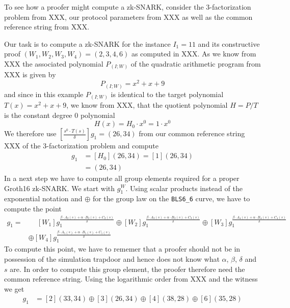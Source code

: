 \begin{example} To see how a proofer might compute 
a zk-SNARK, consider the $3$-factorization problem from XXX, our protocol parameters from XXX as well as the common reference string from XXX.

Our task is to compute a zk-SNARK for the instance $I_1=11$ and its constructive proof $(W_1,W_2,W_3,W_4)=(2,3,4,6)$ as computed in XXX. As we know from XXX the associated polynomial $P_{(I;W)}$ of the quadratic arithmetic program from XXX is given by
$$
P_{(I;W)} = x^2 + x + 9
$$ 
and since in this example $P_{(I;W)}$ is identical to the target polynomial $T(x)=x^2+x + 9$, we know from XXX, that the quotient polynomial $H=P/T$ is the constant degree $0$ polynomial
$$
H(x)= H_0 \cdot x^0 = 1 \cdot x^0
$$
We therefore use $[\frac{s^0\cdot T(s)}{\delta}]g_1=(26,34)$ from our common reference string XXX of the $3$-factorization problem and compute 
\begin{align*}
[\frac{H(s)\cdot T(s)}{\delta}]g_1 &= [H_0](26,34)=[1](26,34)\\
                                   &= (26,34)
\end{align*}
In a next step we have to compute all group elements required for a proper Groth16 zk-SNARK. We start with $g_1^W$. Using scalar products instead of the exponential notation and $\oplus$ for the group law on the \texttt{BLS6\_6} curve, we have to compute the point
\begin{align*}
[W]g_1 = & \phantom{\oplus} [W_1] g_1^{\frac{\beta\cdot A_{2}(s)+\alpha\cdot B_{2}(s)+C_{2}(s)}{\delta}}
        \oplus [W_2] g_1^{\frac{\beta\cdot A_{3}(s)+\alpha\cdot B_{3}(s)+C_{3}(s)}{\delta}}        
         \oplus [W_3] g_1^{\frac{\beta\cdot A_{4}(s)+\alpha\cdot B_{4}(s)+C_{4}(s)}{\delta}}\\        
         &\oplus [W_4] g_1^{\frac{\beta\cdot A_{5}(s)+\alpha\cdot B_{5}(s)+C_{5}(s)}{\delta}}
\end{align*}
To compute this point, we have to rememer that a proofer should not be in possession of the simulation trapdoor and hence does not know what $\alpha$, $\beta$, $\delta$ and $s$ are. In order to compute this group element, the proofer therefore need the common reference string. Using the logarithmic order from XXX and the witness we get
\begin{align*}
[W]g_1 & = [2](33,34)\oplus [3](26,34)\oplus [4](38,28)\oplus [6](35,28) \\

\end{align*}
\end{example}
